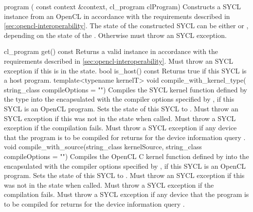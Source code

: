   \addRowThreeL
    {program (}
    {const context \&context,}
    {cl_program clProgram)}
    {
      Constructs a SYCL  instance from an OpenCL  in accordance with the requirements described in \ref{sec:opencl-interoperability}. The state of the constructed SYCL  can be either  or , depending on the state of the . Otherwise must throw an  SYCL exception.
    }
\completeTable

  \addRow
    {cl_program get() const}
    {
      Returns a valid  instance in accordance with the requirements described in \ref{sec:opencl-interoperability}. Must throw an  SYCL exception if this  is in the  state.
    }
  \addRow
    {bool is_host() const}
    {
      Returns true if this SYCL  is a host program.
    }
  \addRowThreeL
    {template<typename kernelT>}
    {void compile_with_kernel_type(}
    {string_class compileOptions = "")}
    {
      Compiles the SYCL kernel function defined by the type  into the encapsulated  with the compiler options specified by , if this SYCL  is an OpenCL program. Sets the state of this SYCL  to . Must throw an  SYCL exception if this  was not in the  state when called. Must throw a   SYCL exception if the compilation fails.  Must throw a  SYCL exception if any device that the program is to be compiled for returns  for the device information query .
    }
  \addRowTwoL
    {void compile_with_source(string_class kernelSource, }
    {string_class compileOptions = "")}
    {
      Compiles the OpenCL C kernel function defined by  into the encapsulated  with the compiler options specified by , if this SYCL  is an OpenCL program. Sets the state of this SYCL  to . Must throw an  SYCL exception if this  was not in the  state when called. Must throw a   SYCL exception if the compilation fails.  Must throw a  SYCL exception if any device that the program is to be compiled for returns  for the device information query .
    }
